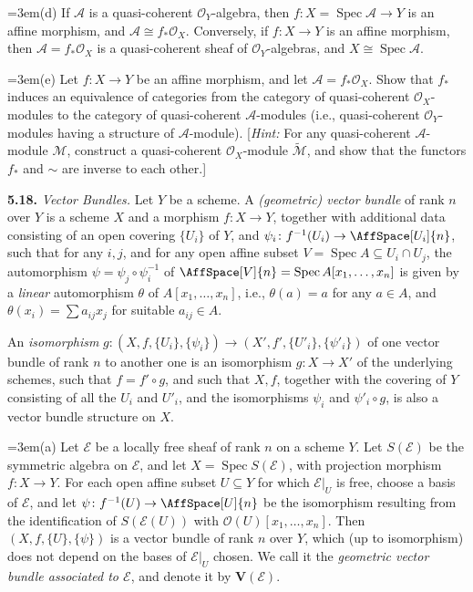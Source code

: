 {\noindent\hangindent=3em\hspace*{1.7em}(d) If $\mathcal A$ is a quasi-coherent $\mathcal O_Y$-algebra, then $f\colon X=\operatorname{Spec}\mathcal A\to Y$ is an affine morphism, and $\mathcal A\cong f_*\mathcal O_X$. Conversely, if $f\colon X\to Y$ is an affine morphism, then $\mathcal A=f_*\mathcal O_X$ is a quasi-coherent sheaf of $\mathcal O_Y$-algebras, and $X\cong\operatorname{Spec}\mathcal A$.

\noindent\hangindent=3em\hspace*{1.7em}(e) Let $f\colon X\to Y$ be an affine morphism, and let $\mathcal A=f_*\mathcal O_X$. Show that $f_*$ induces an equivalence of categories from the category of quasi-coherent $\mathcal O_X$-modules to the category of quasi-coherent $\mathcal A$-modules (i.e., quasi-coherent $\mathcal O_Y$-modules having a structure of $\mathcal A$-module). [\emph{Hint:} For any quasi-coherent $\mathcal A$-module $\mathcal M$, construct a quasi-coherent $\mathcal O_X$-module $\widetilde{\mathcal M}$, and show that the functors $f_*$ and $\sim$ are inverse to each other.]

\smallskip
\noindent\hypertarget{ex-II-5.18}{}\textbf{5.18.} \emph{Vector Bundles.} Let $Y$ be a scheme. A \emph{(geometric) vector bundle} of rank $n$ over $Y$ is a scheme $X$ and a morphism $f\colon X\to Y$, together with additional data consisting of an open covering $\{U_i\}$ of $Y$, and  $\psi_i\colon f^{-1}(U_i)\to\AffSpace[U_i]{n}$, such that for any $i,j$, and for any open affine subset $V=\operatorname{Spec} A\subseteq U_i\cap U_j$, the automorphism $\psi=\psi_j\circ\psi_i^{-1}$ of $\AffSpace[V]{n}=\operatorname{Spec} A[x_1,\ldots,x_n]$ is given by a \emph{linear} automorphism $\theta$ of $A[x_1,\ldots,x_n]$, i.e., $\theta(a)=a$ for any $a\in A$, and $\theta(x_i)=\sum a_{ij}x_j$ for suitable $a_{ij}\in A$.

An \emph{isomorphism} $g\colon(X,f,\{U_i\},\{\psi_i\})\to(X',f',\{U'_i\},\{\psi'_i\})$ of one vector bundle of rank $n$ to another one is an isomorphism $g\colon X\to X'$ of the underlying schemes, such that $f=f'\circ g$, and such that $X,f$, together with the covering of $Y$ consisting of all the $U_i$ and $U'_i$, and the isomorphisms $\psi_i$ and $\psi'_i\circ g$, is also a vector bundle structure on $X$.

\noindent\hangindent=3em\hspace*{1.7em}(a) Let $\mathcal E$ be a locally free sheaf of rank $n$ on a scheme $Y$. Let $S(\mathcal E)$ be the symmetric algebra on $\mathcal E$, and let $X=\operatorname{Spec} S(\mathcal E)$, with projection morphism $f\colon X\to Y$. For each open affine subset $U\subseteq Y$ for which $\mathcal E|_U$ is free, choose a basis of $\mathcal E$, and let $\psi\colon f^{-1}(U)\to\AffSpace[U]{n}$ be the isomorphism resulting from the identification of $S(\mathcal E(U))$ with $\mathcal O(U)[x_1,\ldots,x_n]$. Then $(X,f,\{U\},\{\psi\})$ is a vector bundle of rank $n$ over $Y$, which (up to isomorphism) does not depend on the bases of $\mathcal E|_U$ chosen. We call it the \emph{geometric vector bundle associated to $\mathcal E$}, and denote it by $\mathbf V(\mathcal E)$.}
